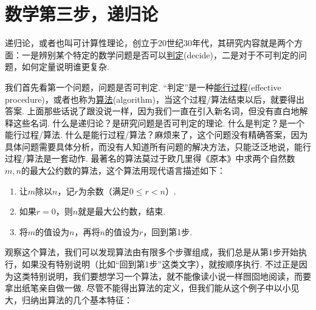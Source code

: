 
\chapter{数学第三步，递归论}

递归论，或者也叫可计算性理论，创立于20世纪30年代，其研究内容就是两个方面：一是辨别某个特定的数学问题是否可以\underline{判定}(decide)，二是对于不可判定的问题，如何定量说明谁更复杂. 

我们首先看第一个问题，问题是否可判定. “判定”是一种\underline{能行过程}(effective procedure)，或者也称为\underline{算法}(algorithm)，当这个过程/算法结束以后，就要得出答案. 上面那些话说了跟没说一样，因为我们一直在引入新名词，但没有直白地解释这些名词. 什么是递归论？是研究问题是否可判定的理论. 什么是判定？是一个能行过程/算法. 什么是能行过程/算法？麻烦来了，这个问题没有精确答案，因为具体问题需要具体分析，而没有人知道所有问题的解决方法，只能泛泛地说，能行过程/算法是一套动作. 最著名的算法莫过于欧几里得《原本》中求两个自然数\(m,n\)的最大公约数的算法，这个算法用现代语言描述如下：
\begin{enumerate}
    \item 让\(m\)除以\(n\)，记\(r\)为余数（满足\(0\leq r < n\)）.
    \item 如果\(r=0\)，则\(n\)就是最大公约数，结束.
    \item 将\(m\)的值设为\(n\)，再将\(n\)的值设为\(r\)，回到第1步.
\end{enumerate}
观察这个算法，我们可以发现算法由有限多个步骤组成，我们总是从第1步开始执行，如果没有特别说明（比如“回到第1步”这类文字），就按顺序执行. 不过正是因为这类特别说明，我们要想学习一个算法，就不能像读小说一样囫囵地阅读，而要拿出纸笔亲自做一做. 尽管不能得出算法的定义，但我们能从这个例子中以小见大，归纳出算法的几个基本特征：
